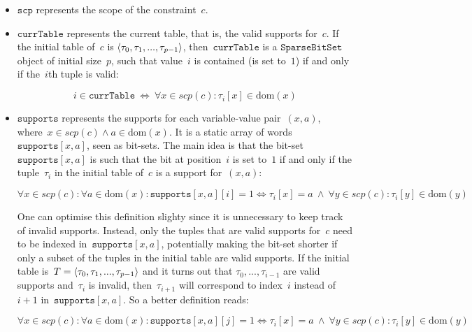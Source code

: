 \documentclass[a4paper,11pt]{article}
\newcommand{\Dom}[1]{\text{dom}({#1})}
\newcommand{\SparseBitSet}{\texttt{SparseBitSet}}
\newcommand{\Scp}{\texttt{scp}}
\newcommand{\CurrTable}{\texttt{currTable}}
\newcommand{\Supports}{\texttt{supports}}
\begin{document}
\begin{itemize}
  \item $\Scp$ represents the scope of the constraint~$c$.
  \item $\CurrTable$ represents the current table,
    that is, the valid supports for~$c$. If the initial table of~$c$ is
    $\left\langle\tau_0, \tau_1, ..., \tau_{p-1}\right\rangle$, then~$\CurrTable$ is a 
    $\SparseBitSet$ object of initial size~$p$, such that value~$i$
    is contained (is set to~$1$) if and only if the~$i$th tuple is valid:
    
    \begin{equation}
      i \in \CurrTable \ \Leftrightarrow \ \forall x \in scp(c): \tau_i[x] \in \Dom{x}
    \end{equation}

  \item $\Supports$ represents the supports for each variable-value pair~$(x,a)$,
    where~$x \in scp(c) \land a \in \Dom{x}$.
    It is a static array of words~$\Supports[x,a]$, seen as bit-sets.
    The main idea is that the bit-set~$\Supports[x,a]$ is such that
    the bit at position~$i$ is set to~$1$ if and only if the 
    tuple~$\tau_i$ in the initial table of~$c$ is a support for~$(x,a)$:

    \begin{equation}
      \forall x \in scp(c): \forall a \in \Dom{x}:
      \Supports[x,a][i] = 1 \Leftrightarrow \tau_i[x] = a \ \land \
      \forall y \in scp(c): \tau_i[y] \in \Dom{y}
    \end{equation}

    One can optimise this definition slighty since it is unnecessary to keep track of
    invalid supports. Instead, only the tuples that are valid supports for~$c$
    need to be indexed in~$\Supports[x,a]$, potentially making the bit-set shorter
    if only a subset of the tuples in the initial table are valid supports. 
    If the initial table 
    is~$T = \left\langle\tau_0, \tau_1, ..., \tau_{p-1}\right\rangle$ and it turns out that
    $\tau_0,...,\tau_{i-1}$ are valid supports and~$\tau_{i}$ is invalid, then~$\tau_{i+1}$
    will correspond to index~$i$ instead of~$i+1$ in~$\Supports[x,a]$. So a better
    definition reads:

    \begin{equation}
      \forall x \in scp(c): \forall a \in \Dom{x}:
      \Supports[x,a][j] = 1 \Leftrightarrow \tau_i[x] = a \ \land \
      \forall y \in scp(c): \tau_i[y] \in \Dom{y}
    \end{equation}
    

\end{itemize}
\end{document}
